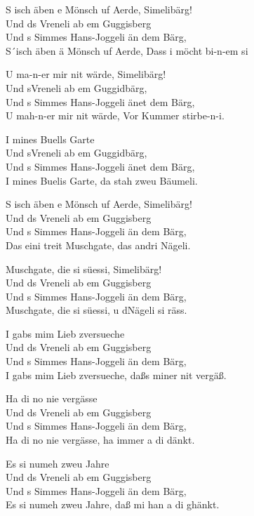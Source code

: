 \documentclass[
  letterpaper,
  twoside=false]{scrbook}
\begin{document}
S isch äben e Mönsch uf Aerde, Simelibärg!\\
Und ds Vreneli ab em Guggisberg\\
Und s Simmes Hans-Joggeli än dem Bärg,\\
S´isch äben ä Mönsch uf Aerde, Dass i möcht bi-n-em si

U ma-n-er mir nit wärde, Simelibärg!\\
Und s\textquotesingle Vreneli ab em Guggidbärg,\\
Und s\textquotesingle{} Simmes Hans-Joggeli änet dem Bärg,\\
U mah-n-er mir nit wärde, Vor Kummer stirbe-n-i.

I mines Buells Garte\\
Und s\textquotesingle Vreneli ab em Guggidbärg,\\
Und s\textquotesingle{} Simmes Hans-Joggeli änet dem Bärg,\\
I mines Buelis Garte, da stah zweu Bäumeli.

S isch äben e Mönsch uf Aerde, Simelibärg!\\
Und ds Vreneli ab em Guggisberg\\
Und s Simmes Hans-Joggeli än dem Bärg,\\
Das eini treit Muschgate, das andri Nägeli.

Muschgate, die si süessi, Simelibärg!\\
Und ds Vreneli ab em Guggisberg\\
Und s Simmes Hans-Joggeli än dem Bärg,\\
Muschgate, die si süessi, u d\textquotesingle Nägeli si räss.

I gabs mim Lieb z\textquotesingle versueche\\
Und ds Vreneli ab em Guggisberg\\
Und s Simmes Hans-Joggeli än dem Bärg,\\
I gabs mim Lieb z\textquotesingle versueche, daßs miner nit vergäß.

Ha di no nie vergässe\\
Und ds Vreneli ab em Guggisberg\\
Und s Simmes Hans-Joggeli än dem Bärg,\\
Ha di no nie vergässe, ha immer a di dänkt.

Es si numeh zweu Jahre\\
Und ds Vreneli ab em Guggisberg\\
Und s Simmes Hans-Joggeli än dem Bärg,\\
Es si numeh zweu Jahre, daß mi han a di ghänkt.
\end{document}
